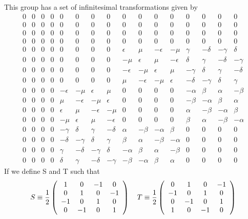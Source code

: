 \documentclass[12pt]{article}
\begin{document}
 This group has a set of infinitesimal transformations given by
\begin{displaymath}
\begin{array}{cccccccccccccccc}
0 & 0 & 0 & 0 & 0 & 0 & 0 & 0 & 0 & 0 & 0 & 0 & 0 & 0 & 0 & 0 \\
0 & 0 & 0 & 0 & 0 & 0 & 0 & 0 & 0 & 0 & 0 & 0 & 0 & 0 & 0 & 0 \\
0 & 0 & 0 & 0 & 0 & 0 & 0 & 0 & 0 & 0 & 0 & 0 & 0 & 0 & 0 & 0 \\
0 & 0 & 0 & 0 & 0 & 0 & 0 & 0 & 0 & 0 & 0 & 0 & 0 & 0 & 0 & 0 \\
0 & 0 & 0 & 0 & 0 & 0 & 0 & 0 & \epsilon & \mu & -\epsilon & -\mu &
\gamma & -\delta & -\gamma & \delta \\
0 & 0 & 0 & 0 & 0 & 0 & 0 & 0 & -\mu & \epsilon & \mu & -\epsilon &
\delta & \gamma & -\delta & -\gamma \\
0 & 0 & 0 & 0 & 0 & 0 & 0 & 0 & -\epsilon & -\mu & \epsilon & \mu &
-\gamma & \delta & \gamma & -\delta \\
0 & 0 & 0 & 0 & 0 & 0 & 0 & 0 & \mu & -\epsilon & -\mu & \epsilon &
-\delta & -\gamma & \delta & \gamma \\
0 & 0 & 0 & 0 & -\epsilon & -\mu & \epsilon & \mu & 0 & 0 & 0 & 0 & 
-\alpha & \beta & \alpha & -\beta \\
0 & 0 & 0 & 0 & \mu & -\epsilon & -\mu & \epsilon & 0 & 0 & 0 & 0 & 
-\beta & -\alpha & \beta & \alpha \\
0 & 0 & 0 & 0 & \epsilon & \mu & -\epsilon & -\mu & 0 & 0 & 0 & 0 & 
\alpha & -\beta & -\alpha & \beta \\
0 & 0 & 0 & 0 & -\mu & \epsilon & \mu & -\epsilon & 0 & 0 & 0 & 0 & 
\beta & \alpha & -\beta & -\alpha \\
0 & 0 & 0 & 0 & -\gamma & \delta & \gamma & -\delta &
\alpha & -\beta & -\alpha & \beta & 0 & 0 & 0 & 0 \\
0 & 0 & 0 & 0 & -\delta & -\gamma & \delta & \gamma &
\beta & \alpha & -\beta & -\alpha & 0 & 0 & 0 & 0 \\
0 & 0 & 0 & 0 & \gamma & -\delta & -\gamma & \delta &
-\alpha & \beta & \alpha & -\beta & 0 & 0 & 0 & 0 \\
0 & 0 & 0 & 0 & \delta & \gamma & -\delta & -\gamma & 
-\beta & -\alpha & \beta & \alpha & 0 & 0 & 0 & 0 
\end{array}
\end{displaymath}
If we define S and T such that
$$
S \equiv {1 \over 2}  \left( 
\begin{array}{cccc}
1 & 0 & -1 & 0 \\
0 & 1 & 0 & -1 \\
-1 & 0 & 1 & 0 \\
0 & -1 & 0 & 1
\end{array} \right) \quad
T \equiv {1 \over 2}  \left(
\begin{array}{cccc}0 & 1 & 0 & -1 \\
-1 & 0 & 1 & 0 \\
0 & -1 & 0 & 1 \\
1 & 0 & -1 & 0
\end{array} \right)
$$
\end{document}
